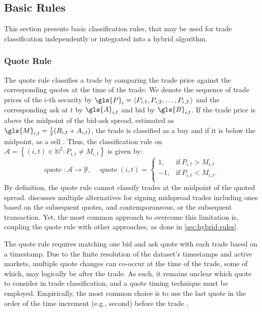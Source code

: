 \subsection{Basic Rules}\label{sec:basic-rules}

This section presents basic classification rules, that may be used for trade classification independently or integrated into a hybrid algorithm.

\subsubsection{Quote Rule}\label{sec:quote-rule}

The quote rule classifies a trade by comparing the trade price against the corresponding quotes at the time of the trade. We denote the sequence of trade prices of the $i$-th security by $\gls{P}_i = \langle P_{i,1},P_{i,2},\dots,P_{i,T}\rangle$ and the corresponding ask at $t$ by $\gls{A}_{i,t}$ and bid by $\gls{B}_{i,t}$. If the trade price is above the midpoint of the bid-ask spread, estimated as $\gls{M}_{i,t} = \tfrac{1}{2}(B_{i,t} + A_{i,t})$, the trade is classified as a buy and if it is below the midpoint, as a sell \autocite[][41]{harrisDayEndTransactionPrice1989}. Thus, the classification rule on $\mathcal{A} = \left\{(i, t) \in \mathbb{N}^2: P_{i,t} \neq M_{i,t}\right\}$ is given by:
\begin{equation}
    \operatorname{quote}\colon \mathcal{A} \to \mathcal{Y},\quad
    \operatorname{quote}(i, t)=
    \begin{cases}
        1,  & \mathrm{if}\ P_{i, t}>M_{i, t}  \\
        -1, & \mathrm{if}\ P_{i, t}<M_{i, t}. \\
    \end{cases}
\end{equation}
By definition, the quote rule cannot classify trades at the midpoint of the quoted spread. \textcite[][241]{hasbrouckTradesQuotesInventories1988} discusses multiple alternatives for signing midspread trades including ones based on the subsequent quotes, and contemporaneous, or the subsequent transaction. Yet, the most common approach to overcome this limitation is, coupling the quote rule with other approaches, as done in \cref{sec:hybrid-rules}.

The quote rule requires matching one bid and ask quote with each trade based on a timestamp. Due to the finite resolution of the dataset's timestamps and active markets, multiple quote changes can co-occur at the time of the trade, some of which, may logically be after the trade. As such, it remains unclear which quote to consider in trade classification, and a quote timing technique must be employed. Empirically, the most common choice is to use the last quote in the order of the time increment (e.g., second) before the trade \autocite[][1765]{holdenLiquidityMeasurementProblems2014}.

